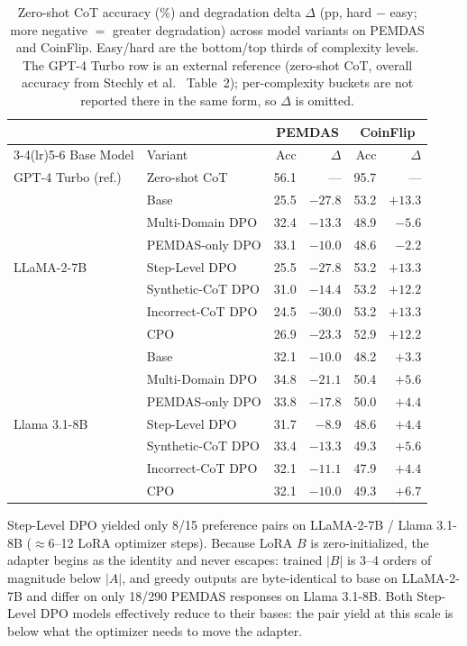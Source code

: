 \documentclass{article}
\begin{document}
\begin{table}[h]
\centering
\caption{Zero-shot CoT accuracy (\%) and degradation delta $\Delta$ (pp, hard $-$ easy; more negative $=$ greater degradation) across model variants on PEMDAS and CoinFlip. Easy/hard are the bottom/top thirds of complexity levels. The GPT-4 Turbo row is an external reference (zero-shot CoT, overall accuracy from Stechly et al.~\cite{stechly2024thoughtlessness} Table~2); per-complexity buckets are not reported there in the same form, so $\Delta$ is omitted.}
\label{tab:main-results}
\begin{tabular}{llrrrr}
\toprule
 & & \multicolumn{2}{c}{PEMDAS} & \multicolumn{2}{c}{CoinFlip} \\
\cmidrule(lr){3-4}\cmidrule(lr){5-6}
Base Model & Variant & Acc & $\Delta$ & Acc & $\Delta$ \\
\midrule
GPT-4 Turbo (ref.) & Zero-shot CoT~\cite{stechly2024thoughtlessness} & 56.1 & --- & 95.7 & --- \\
\midrule
\multirow{7}{*}{LLaMA-2-7B} & Base & 25.5 & $-27.8$ & 53.2 & $+13.3$ \\
 & Multi-Domain DPO & 32.4 & $-13.3$ & 48.9 & $-5.6$ \\
 & PEMDAS-only DPO & 33.1 & $-10.0$ & 48.6 & $-2.2$ \\
 & Step-Level DPO & 25.5 & $-27.8$ & 53.2 & $+13.3$ \\
 & Synthetic-CoT DPO & 31.0 & $-14.4$ & 53.2 & $+12.2$ \\
 & Incorrect-CoT DPO & 24.5 & $-30.0$ & 53.2 & $+13.3$ \\
 & CPO & 26.9 & $-23.3$ & 52.9 & $+12.2$ \\
\midrule
\multirow{7}{*}{Llama 3.1-8B} & Base & 32.1 & $-10.0$ & 48.2 & $+3.3$ \\
 & Multi-Domain DPO & 34.8 & $-21.1$ & 50.4 & $+5.6$ \\
 & PEMDAS-only DPO & 33.8 & $-17.8$ & 50.0 & $+4.4$ \\
 & Step-Level DPO & 31.7 & $-8.9$ & 48.6 & $+4.4$ \\
 & Synthetic-CoT DPO & 33.4 & $-13.3$ & 49.3 & $+5.6$ \\
 & Incorrect-CoT DPO & 32.1 & $-11.1$ & 47.9 & $+4.4$ \\
 & CPO & 32.1 & $-10.0$ & 49.3 & $+6.7$ \\
\bottomrule
\end{tabular}
\end{table}

Step-Level DPO yielded only 8/15 preference pairs on LLaMA-2-7B / Llama 3.1-8B (${\approx}6$--12 LoRA optimizer steps). Because LoRA $B$ is zero-initialized, the adapter begins as the identity and never escapes: trained $|B|$ is 3--4 orders of magnitude below $|A|$, and greedy outputs are byte-identical to base on LLaMA-2-7B and differ on only 18/290 PEMDAS responses on Llama 3.1-8B. Both Step-Level DPO models effectively reduce to their bases: the pair yield at this scale is below what the optimizer needs to move the adapter.
\end{document}
